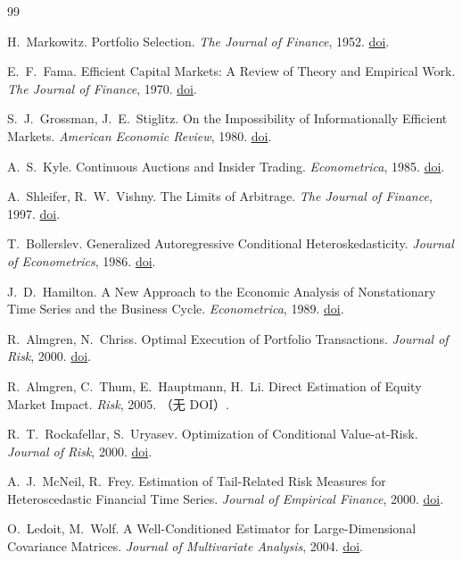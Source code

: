 \begin{thebibliography}{99}

 H.~Markowitz. Portfolio Selection. \emph{The Journal of Finance}, 1952. \href{https://doi.org/10.1111/j.1540-6261.1952.tb01525.x}{doi}.

 E.~F.~Fama. Efficient Capital Markets: A Review of Theory and Empirical Work. \emph{The Journal of Finance}, 1970. \href{https://doi.org/10.1111/j.1540-6261.1970.tb00518.x}{doi}.

 S.~J.~Grossman, J.~E.~Stiglitz. On the Impossibility of Informationally Efficient Markets. \emph{American Economic Review}, 1980. \href{https://doi.org/10.7916/d8765r99}{doi}.

 A.~S.~Kyle. Continuous Auctions and Insider Trading. \emph{Econometrica}, 1985. \href{https://doi.org/10.2307/1913210}{doi}.

 A.~Shleifer, R.~W.~Vishny. The Limits of Arbitrage. \emph{The Journal of Finance}, 1997. \href{https://doi.org/10.1111/j.1540-6261.1997.tb03807.x}{doi}.

 T.~Bollerslev. Generalized Autoregressive Conditional Heteroskedasticity. \emph{Journal of Econometrics}, 1986. \href{https://doi.org/10.1016/0304-4076(86)90063-1}{doi}.

 J.~D.~Hamilton. A New Approach to the Economic Analysis of Nonstationary Time Series and the Business Cycle. \emph{Econometrica}, 1989. \href{https://doi.org/10.2307/1912559}{doi}.

 R.~Almgren, N.~Chriss. Optimal Execution of Portfolio Transactions. \emph{Journal of Risk}, 2000. \href{https://doi.org/10.21314/jor.2001.041}{doi}.

 R.~Almgren, C.~Thum, E.~Hauptmann, H.~Li. Direct Estimation of Equity Market Impact. \emph{Risk}, 2005. （无 DOI）.

 R.~T.~Rockafellar, S.~Uryasev. Optimization of Conditional Value-at-Risk. \emph{Journal of Risk}, 2000. \href{https://doi.org/10.21314/jor.2000.038}{doi}.

 A.~J.~McNeil, R.~Frey. Estimation of Tail-Related Risk Measures for Heteroscedastic Financial Time Series. \emph{Journal of Empirical Finance}, 2000. \href{https://doi.org/10.1016/s0927-5398(00)00012-8}{doi}.

 O.~Ledoit, M.~Wolf. A Well-Conditioned Estimator for Large-Dimensional Covariance Matrices. \emph{Journal of Multivariate Analysis}, 2004. \href{https://doi.org/10.1016/s0047-259x(03)00096-4}{doi}.


\end{thebibliography}
